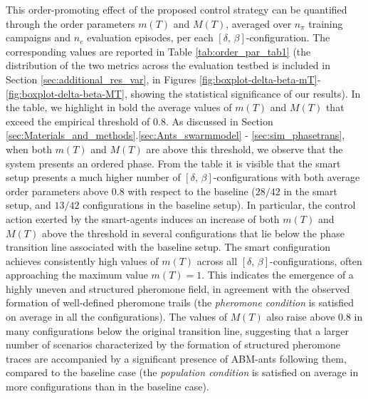 \documentclass[pdflatex,sn-mathphys-num]{sn-jnl}%
\theoremstyle{thmstyleone}%
\theoremstyle{thmstyletwo}%
\theoremstyle{thmstylethree}%
\begin{document}
This order-promoting effect of the proposed control strategy can be quantified through the order parameters $m(T)$ and $M(T)$, averaged over $n_{\pi}$ training campaigns and $n_{e}$ evaluation episodes, per each $\left[ \delta, \, \beta \right]$-configuration. The corresponding values are reported in Table \ref{tab:order_par_tab1} (the distribution of the two metrics across the evaluation testbed is included in Section \ref{sec:additional_res_var}, in Figures \ref{fig:boxplot-delta-beta-mT}-\ref{fig:boxplot-delta-beta-MT}, showing the statistical significance of our results). In the table, we highlight in bold the average values of $m(T)$ and $M(T)$ that exceed the empirical threshold of $0.8$. As discussed in Section \ref{sec:Materials_and_methods}.\ref{sec:Ants_swarmmodel} - \ref{sec:sim_phasetrans}, when both $m(T)$ and $M(T)$ are above this threshold, we observe that the system presents an ordered phase. From the table it is visible that the smart setup presents a much higher number of $\left[ \delta, \, \beta \right]$-configurations with both average order parameters above $0.8$ with respect to the baseline ($28/42$ in the smart setup, and $13/42$ configurations in the baseline setup). In particular, the control action exerted by the smart-agents induces an increase of both $m(T)$ and $M(T)$ above the threshold in several configurations that lie below the phase transition line associated with the baseline setup. The smart configuration achieves consistently high values of $m(T)$ across all $\left[ \delta, \, \beta \right]$-configurations, often approaching the maximum value $m(T)=1$. This indicates the emergence of a highly uneven and structured pheromone field, in agreement with the observed formation of well-defined pheromone trails (the \textit{pheromone condition} is satisfied on average in all the configurations). The values of $M(T)$ also raise above $0.8$ in many configurations below the original transition line, suggesting that a larger number of scenarios characterized by the formation of structured pheromone traces are accompanied by a significant presence of ABM-ants following them, compared to the baseline case (the \textit{population condition} is satisfied on average in more configurations than in the baseline case). 
\end{document}
